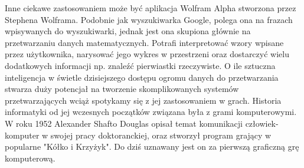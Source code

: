 \begin{par}
Inne ciekawe zastosowaniem może być aplikacja Wolfram Alpha stworzona przez Stephena Wolframa.
Podobnie jak wyszukiwarka Google, polega ona na frazach wpisywanych do wyszukiwarki, jednak jest ona skupiona głównie na przetwarzaniu danych matematycznych.
Potrafi interpretować wzory wpisane przez użytkownika, narysować jego wykres w przestrzeni oraz dostarczyć wielu dodatkowych informacji np. znaleźć pierwiastki rzeczywiste.
O ile sztuczna inteligencja w świetle dzisiejszego dostępu ogromu danych do przetwarzania stwarza duży potencjał na tworzenie skomplikowanych systemów przetwarzających wciąż spotykamy
się z jej zastosowaniem w grach.
Historia informatyki od jej wczesnych początków związana była z grami komputerowymi. 
W roku 1952 Alexander Shafto Douglas opisał temat komunikacji człowiek-komputer w swojej pracy doktoranckiej, oraz stworzył program grający w popularne "Kółko i Krzyżyk".
Do dziś uznawany jest on za pierwszą graficzną grę komputerową.
\end{par}

